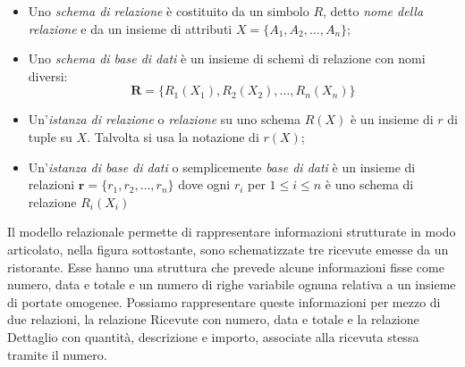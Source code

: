 \documentclass[12pt]{report}
\begin{document}
	\begin{itemize}
		\item Uno \textit{schema di relazione} è costituito da un simbolo $R$, detto \textit{nome della relazione} e da un insieme di attributi $X = \{A_1, A_2, \dots, A_n\}$;
		\item Uno \textit{schema di base di dati} è un insieme di schemi di relazione con nomi diversi:
		\[
		\mathbf{R} = \{R_1(X_1), R_2(X_2), \dots, R_n(X_n)\}
		\]
		\item Un'\textit{istanza di relazione} o \textit{relazione} su uno schema $R(X)$ è un insieme di $r$ di tuple su $X$. Talvolta si usa la notazione di $r(X)$;
		\item Un'\textit{istanza di base di dati} o semplicemente \textit{base di dati} è un insieme di relazioni $\mathbf{r} = \{r_1, r_2, \dots, r_n\}$ dove ogni $r_i$ per $1 \leq i \leq n$ è uno schema di relazione $R_i(X_i)$
	\end{itemize}
	Il modello relazionale permette di rappresentare informazioni strutturate in modo articolato, nella figura sottostante, sono schematizzate tre ricevute emesse da un ristorante. Esse hanno una struttura che prevede alcune informazioni fisse come numero, data e totale e un numero di righe variabile ognuna relativa a un insieme di portate omogenee. Possiamo rappresentare queste informazioni per mezzo di due relazioni, la relazione Ricevute con numero, data e totale e la relazione Dettaglio con quantità, descrizione e importo, associate alla ricevuta stessa tramite il numero.
\end{document}
